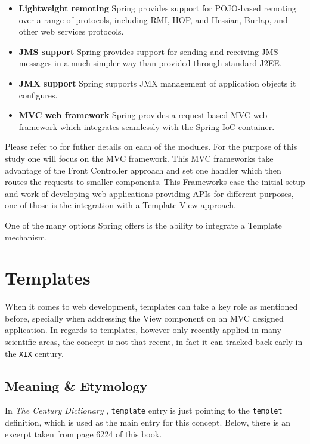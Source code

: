 \begin{review}
\begin{itemize}
	\item \textbf{Lightweight remoting} Spring provides support for POJO-based remoting over a range of protocols, including RMI, IIOP, and Hessian, Burlap, and other web services protocols.
	\item \textbf{JMS support} Spring provides support for sending and receiving JMS messages in a much simpler way than provided through standard J2EE.
	\item \textbf{JMX support} Spring supports JMX management of application objects it configures.
	\item \textbf{MVC web framework} Spring provides a request-based MVC web framework which integrates seamlessly with the Spring IoC container. 
\end{itemize}
\end{review}

Please refer to \cite{Johnson2005ProfessionalFramework} for futher details on each of the modules. For the purpose of this study one will focus on the MVC framework. This MVC frameworks take advantage of the Front Controller approach and set one handler which then routes the requests to smaller components. This Frameworks ease the initial setup and work of developing web applications providing APIs for different purposes, one of those is the integration with a Template View approach.

One of the many options Spring offers is the ability to integrate a Template mechanism.

\section{Templates}

When it comes to web development, templates can take a key role as mentioned before, specially when addressing the View component on an MVC designed application. In regards to templates, however only recently applied in many scientific areas, the concept is not that recent, in fact it can tracked back early in the \texttt{XIX} century.

\subsection{Meaning \& Etymology}

In \textit{The Century Dictionary} \cite[p.6224]{Whitney1906TheDictionary}, \texttt{template} entry is just pointing to the \texttt{templet} definition, which is used as the main entry for this concept. Below, there is an excerpt taken from page 6224 of this book.

